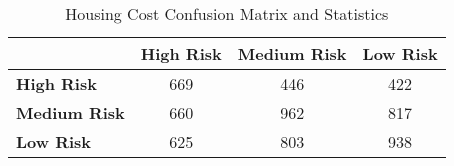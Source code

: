 \begin{table}[!htbp]
    \small
    \centering
    \caption{Housing Cost Confusion Matrix and Statistics}
    \label{tab:cost_confusion}
    \begin{tabular}{lccc}
        \toprule
        & \textbf{High Risk} & \textbf{Medium Risk} & \textbf{Low Risk} \\
        \midrule
        \textbf{High Risk} & 669 & 446 & 422 \\
        \textbf{Medium Risk} & 660 & 962 & 817 \\
        \textbf{Low Risk} & 625 & 803 & 938 \\
        \bottomrule
    \end{tabular}
\end{table}